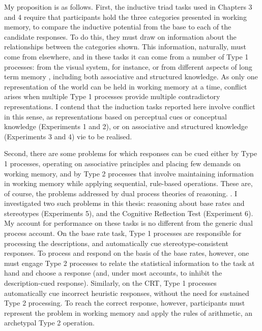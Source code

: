 My proposition is as follows.
First, the inductive triad tasks used in Chapters 3 and 4
require that participants hold
the three categories presented in working memory,
to compare the inductive potential from the base
to each of the candidate responses.
To do this, they must draw on information
about the relationships between the categories shown.
This information, naturally, must come from elsewhere,
and in these tasks it can come from a number of Type 1 processes:
from the visual system, for instance,
or from different aspects of long term memory \citep{Jackson2015},
including both associative and structured knowledge.
As only one representation of the world
can be held in working memory at a time,
conflict arises when multiple Type 1 processes
provide multiple contradictory representations.
I contend that the induction tasks reported here
involve conflict in this sense,
as representations based on perceptual cues or conceptual knowledge
(Experiments 1 and 2),
or on associative and structured knowledge (Experiments 3 and 4)
vie to be realised.

Second, there are some problems for which responses can be cued
either by Type 1 processes,
operating on associative principles and placing few demands on working memory,
and by Type 2 processes
that involve maintaining information in working memory
while applying sequential, rule-based operations.
These are, of course, the problems addressed by
dual process theories of reasoning.
\citep[e.g.][]{Evans2013a,Evans2008,Kahneman2011}.
I investigated two such problems in this thesis:
reasoning about base rates and stereotypes (Experiments 5),
and the Cognitive Reflection Test (Experiment 6).
My account for performance on these tasks
is no different from the generic dual process account.
On the base rate task, Type 1 processes
are responsible for processing the descriptions,
and automatically cue stereotype-consistent responses.
To process and respond on the basis of the base rates, however,
one must engage Type 2 processes to relate
the statistical information to the task at hand and choose a response
(and, under most accounts, to inhibit the description-cued response).
Similarly, on the CRT,
Type 1 processes automatically cue incorrect heuristic responses,
without the need for sustained Type 2 processing.
To reach the correct response, however,
participants must represent the problem in working memory
and apply the rules of arithmetic, an archetypal Type 2 operation.

